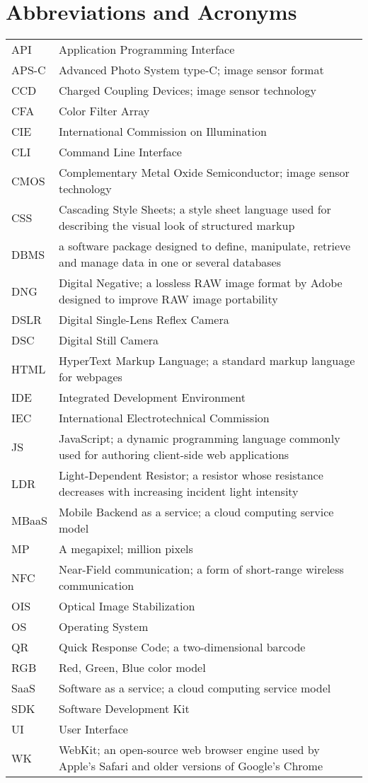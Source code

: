 \documentclass[thesis.tex]{subfiles}
\begin{document}
\chapter*{Abbreviations and Acronyms}

\noindent
\begin{longtable}{@{}p{}p{}@{}}
API & Application Programming Interface \\
APS-C & Advanced Photo System type-C; image sensor format \\
CCD & Charged Coupling Devices; image sensor technology \\
CFA & Color Filter Array \\
CIE & International Commission on Illumination \\
CLI & Command Line Interface \\
CMOS & Complementary Metal Oxide Semiconductor; image sensor technology \\
CSS & Cascading Style Sheets; a style sheet language used for describing the visual look of structured markup \\
DBMS & a software package designed to define, manipulate, retrieve and manage data in one or several databases \\
DNG & Digital Negative; a lossless RAW image format by Adobe designed to improve RAW image portability \\
DSLR & Digital Single-Lens Reflex Camera \\
DSC & Digital Still Camera \\
HTML & HyperText Markup Language; a standard markup language for webpages \\
IDE & Integrated Development Environment \\
IEC & International Electrotechnical Commission \\
JS & JavaScript; a dynamic programming language commonly used for authoring client-side web applications \\
LDR & Light-Dependent Resistor; a resistor whose resistance decreases with increasing incident light intensity \\
MBaaS & Mobile Backend as a service; a cloud computing service model \\
MP & A megapixel; million pixels \\
NFC & Near-Field communication; a form of short-range wireless communication \\
OIS & Optical Image Stabilization \\
OS & Operating System \\
QR & Quick Response Code; a two-dimensional barcode \\
RGB & Red, Green, Blue color model \\
SaaS & Software as a service; a cloud computing service model \\
SDK & Software Development Kit \\
UI & User Interface \\
WK & WebKit; an open-source web browser engine used by Apple's Safari and older versions of Google's Chrome\\

\end{longtable}
\end{document}
